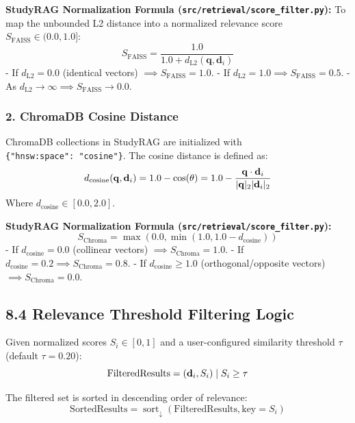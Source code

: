 \documentclass[
]{article}
\begin{document}
\textbf{StudyRAG Normalization Formula
(\texttt{src/\allowbreak retrieval/\allowbreak score\_\allowbreak filter.\allowbreak py}):} To map the unbounded L2
distance into a normalized relevance score
\(S_{\text{FAISS}} \in (0.0, 1.0]\):
\[S_{\text{FAISS}} = \frac{1.0}{1.0 + d_{\text{L2}}(\mathbf{q}, \mathbf{d}_i)}\]
- If \(d_{\text{L2}} = 0.0\) (identical vectors)
\(\implies S_{\text{FAISS}} = 1.0\). - If
\(d_{\text{L2}} = 1.0 \implies S_{\text{FAISS}} = 0.5\). - As
\(d_{\text{L2}} \to \infty \implies S_{\text{FAISS}} \to 0.0\).

\subsubsection{2. ChromaDB Cosine
Distance}\label{chromadb-cosine-distance}

ChromaDB collections in StudyRAG are initialized with
\texttt{\{"hnsw:space":\ \allowbreak "cosine"\}}. The cosine distance is defined as:
\[d_{\text{cosine}}(\mathbf{q}, \mathbf{d}_i) = 1.0 - \cos(\theta) = 1.0 - \frac{\mathbf{q} \cdot \mathbf{d}_i}{\\|\mathbf{q}\\|_2 \\|\mathbf{d}_i\\|_2}\]
Where \(d_{\text{cosine}} \in [0.0, 2.0]\).

\textbf{StudyRAG Normalization Formula
(\texttt{src/\allowbreak retrieval/\allowbreak score\_\allowbreak filter.\allowbreak py}):}
\[S_{\text{Chroma}} = \max\left(0.0, \min\left(1.0, 1.0 - d_{\text{cosine}}\right)\right)\]
- If \(d_{\text{cosine}} = 0.0\) (collinear vectors)
\(\implies S_{\text{Chroma}} = 1.0\). - If
\(d_{\text{cosine}} = 0.2 \implies S_{\text{Chroma}} = 0.8\). - If
\(d_{\text{cosine}} \ge 1.0\) (orthogonal/opposite vectors)
\(\implies S_{\text{Chroma}} = 0.0\).

\subsection{8.4 Relevance Threshold Filtering
Logic}\label{relevance-threshold-filtering-logic}

Given normalized scores \(S_i \in [0, 1]\) and a user-configured
similarity threshold \(\tau\) (default \(\tau = 0.20\)):
\[\text{FilteredResults} = \\{ (\mathbf{d}_i, S_i) \mid S_i \ge \tau \\}\]

The filtered set is sorted in descending order of relevance:
\[\text{SortedResults} = \operatorname{sort}_{\downarrow}( \text{FilteredResults}, \text{key}=S_i )\]
\end{document}
